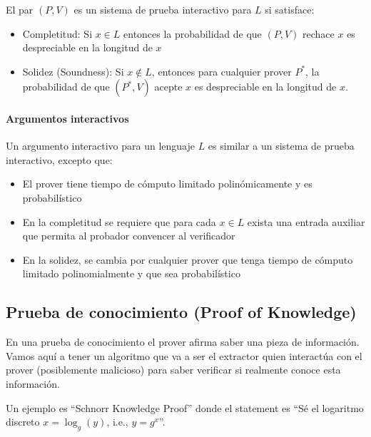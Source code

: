   El par $(P,V)$ es un sistema de prueba interactivo para $L$ si satisface:
  \begin{itemize}
    \item Completitud: Si $x\in L$ entonces la probabilidad de que $(P,V)$ rechace $x$
      es despreciable en la longitud de $x$ 
    \item Solidez (Soundness): Si $x\notin L$, entonces para cualquier prover $P^*$, la
      probabilidad de que $(P^*, V)$ acepte $x$ es despreciable en la longitud de $x$.
  \end{itemize}

  \paragraph{Argumentos interactivos}
  Un argumento interactivo para un lenguaje $L$ es similar a un sistema de prueba 
  interactivo, excepto que:
  \begin{itemize}
    \item El prover tiene tiempo de cómputo limitado polinómicamente y es probabilístico 
    \item En la completitud se requiere que para cada $x \in L$ exista una entrada auxiliar 
      que permita al probador convencer al verificador 
    \item En la solidez, se cambia por cualquier prover que tenga tiempo de cómputo 
      limitado polinomialmente y que sea probabilístico
  \end{itemize}

  \subsection{Prueba de conocimiento (Proof of Knowledge)}
  En una prueba de conocimiento el prover afirma saber una pieza de información.
  Vamos aquí a tener un algoritmo que va a ser el extractor quien interactúa con el 
  prover (posiblemente malicioso) para saber verificar si realmente conoce esta 
  información.

  Un ejemplo es ``Schnorr Knowledge Proof'' donde el statement es 
  ``Sé el logaritmo discreto $x = \log_g(y)$, i.e., $y = g^x$''.


